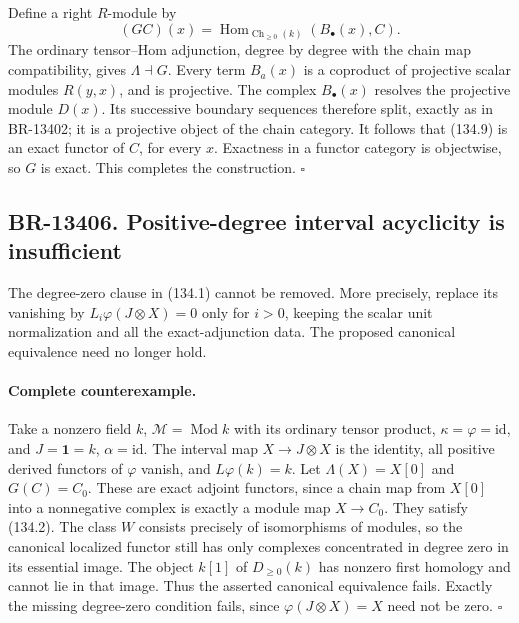 Define a right \(R\)-module by
\[
 (GC)(x)=\operatorname{Hom}_{\operatorname{Ch}_{\geq0}(k)}
                    (B_\bullet(x),C).
 \tag{134.9}
\]
The ordinary tensor--Hom adjunction, degree by degree with the chain
map compatibility, gives \(\Lambda\dashv G\).  Every term
\(B_a(x)\) is a coproduct of projective scalar modules \(R(y,x)\),
and is projective.  The complex \(B_\bullet(x)\) resolves the
projective module \(D(x)\).  Its successive boundary sequences
therefore split, exactly as in BR-13402; it is a projective object of
the chain category.  It follows that (134.9) is an exact functor of
\(C\), for every \(x\).  Exactness in a functor category is
objectwise, so \(G\) is exact.  This completes the construction.
\(\square\)

\subsection{BR-13406. Positive-degree interval acyclicity is insufficient}
The degree-zero clause in (134.1) cannot be removed.  More precisely,
replace its vanishing by
\(L_i\varphi(J\otimes X)=0\) only for \(i>0\), keeping the scalar
unit normalization and all the exact-adjunction data.  The proposed
canonical equivalence need no longer hold.

\paragraph{Complete counterexample.}
Take a nonzero field \(k\), \(\mathcal M=\operatorname{Mod}k\)
with its ordinary tensor product, \(\kappa=\varphi=\mathrm{id}\),
and \(J=\mathbf1=k\), \(\alpha=\mathrm{id}\).  The interval map
\(X\to J\otimes X\) is the identity, all positive derived functors
of \(\varphi\) vanish, and \(L\varphi(k)=k\).  Let
\(\Lambda(X)=X[0]\) and \(G(C)=C_0\).  These are exact adjoint
functors, since a chain map from \(X[0]\) into a nonnegative complex
is exactly a module map \(X\to C_0\).  They satisfy (134.2).
The class \(W\) consists precisely of isomorphisms of modules, so
the canonical localized functor still has only complexes concentrated
in degree zero in its essential image.  The object \(k[1]\) of
\(D_{\geq0}(k)\) has nonzero first homology and cannot lie in that
image.  Thus the asserted canonical equivalence fails.  Exactly the
missing degree-zero condition fails, since
\(\varphi(J\otimes X)=X\) need not be zero. \(\square\)

